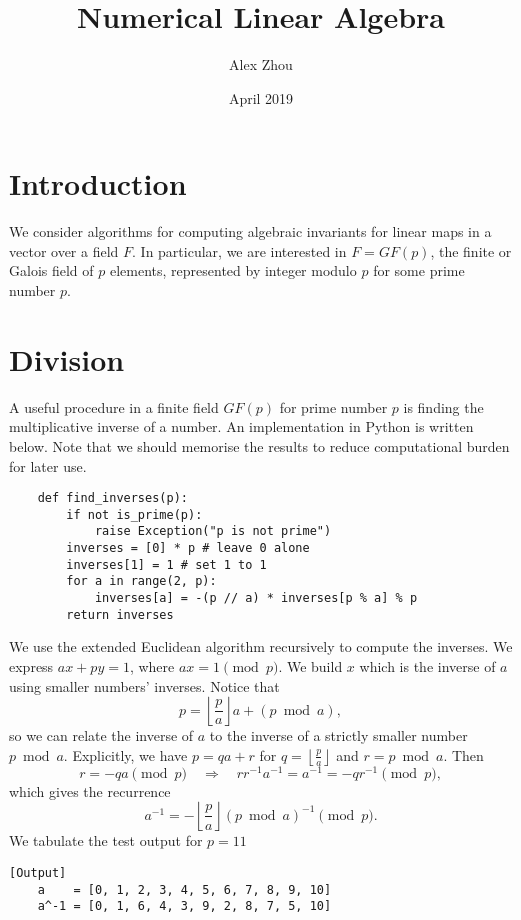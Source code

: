 \documentclass{article}
\title{Numerical Linear Algebra}
\author{Alex Zhou}
\date{April 2019}
\begin{document}
\maketitle

\section{Introduction}
We consider algorithms for computing algebraic invariants for linear maps in a vector over a field \(F\). In particular, we are interested in \(F = GF(p)\), the finite or Galois field of \(p\) elements, represented by integer modulo \(p\) for some prime number \(p\).

\section{Division}

A useful procedure in a finite field \(GF(p)\) for prime number \(p\) is finding the multiplicative inverse of a number. An implementation in Python is written below. Note that we should memorise the results to reduce computational burden for later use.

\begin{verbatim}
    def find_inverses(p):
        if not is_prime(p):
            raise Exception("p is not prime")
        inverses = [0] * p # leave 0 alone
        inverses[1] = 1 # set 1 to 1
        for a in range(2, p):
            inverses[a] = -(p // a) * inverses[p % a] % p
        return inverses
\end{verbatim}

We use the extended Euclidean algorithm recursively to compute the inverses. We express \(ax + py = 1\), where \(ax = 1 \pmod p\). We build \(x\) which is the inverse of \(a\) using smaller numbers' inverses. Notice that
\[ p = \left\lfloor \frac{p}{a}\right\rfloor a + (p \bmod a), \]
so we can relate the inverse of \(a\) to the inverse of a strictly smaller number \(p \bmod a\). Explicitly, we have \(p = qa + r\) for \(q = \left\lfloor \frac{p}{a} \right\rfloor\) and \(r = p \bmod a\). Then
\[ r = -qa \pmod p \quad\Rightarrow\quad rr^{-1}a^{-1} = a^{-1} = -qr^{-1} \pmod p, \]
which gives the recurrence 
\[a^{-1} = - \left\lfloor \frac{p}{a} \right\rfloor (p \bmod a)^{-1} \pmod p.\]
We tabulate the test output for \(p = 11\)

\begin{verbatim}[Output]
    a    = [0, 1, 2, 3, 4, 5, 6, 7, 8, 9, 10]
    a^-1 = [0, 1, 6, 4, 3, 9, 2, 8, 7, 5, 10]
\end{verbatim}
\end{document}
